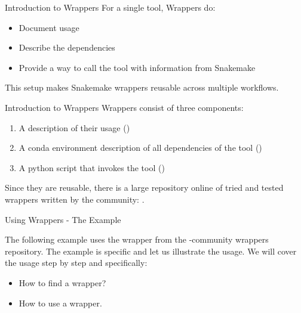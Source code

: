 \begin{frame}{Introduction to Wrappers}
    For a single tool, \Snakemake{} Wrappers do:
    \begin{itemize}[<+->]
        \item Document usage
        \item Describe the dependencies
        \item Provide a way to call the tool with information from Snakemake
    \end{itemize}
    This setup makes Snakemake wrappers reusable across multiple workflows.
\end{frame}

\begin{frame}{Introduction to Wrappers}
    Wrappers consist of three components:
    \begin{enumerate}
        \item A description of their usage ()
        \item A conda environment description of all dependencies of the tool ()
        \item A python script that invokes the tool ()
    \end{enumerate}
    Since they are reusable, there is a large repository online of tried and tested 
    wrappers written by the community: .
\end{frame}

\begin{frame}[fragile]{Using Wrappers - The Example}
	\begin{docs}
		The following example uses the  wrapper from the \Snakemake-community wrappers repository. The example is specific and let us illustrate the usage.
		We will cover the usage step by step and specifically:
		\begin{itemize}
			\item How to find a wrapper?
			\item How to use a wrapper.
		\end{itemize}
	\end{docs}
\end{frame}

